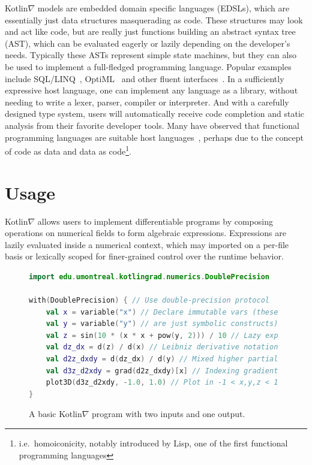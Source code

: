 \documentclass[12pt,initial,twoside,maitrise]{dms}
\numberwithin{equation}{section}
\numberwithin{table}{chapter}
\numberwithin{figure}{chapter}
\begin{document}
Kotlin$\nabla$ models are embedded domain specific languages (EDSLs), which are essentially just data structures masquerading as code. These structures may look and act like code, but are really just functions building an abstract syntax tree (AST), which can be evaluated eagerly or lazily depending on the developer's needs. Typically these ASTs represent simple state machines, but they can also be used to implement a full-fledged programming language. Popular examples include SQL/LINQ~\cite{meijer2006linq}, OptiML~\cite{sujeeth2011optiml} and other fluent interfaces~\cite{fowler05fluent}. In a sufficiently expressive host language, one can implement any language as a library, without needing to write a lexer, parser, compiler or interpreter. And with a carefully designed type system, users will automatically receive code completion and static analysis from their favorite developer tools. Many have observed that functional programming languages are suitable host languages~\cite{elliott2003compiling,rompf2010lightweight}, perhaps due to the concept of code as data and data as code\footnote{i.e.\ homoiconicity, notably introduced by Lisp, one of the first functional programming languages}.

\section{Usage}

Kotlin$\nabla$ allows users to implement differentiable programs by composing operations on numerical fields to form algebraic expressions. Expressions are lazily evaluated inside a numerical context, which may imported on a per-file basis or lexically scoped for finer-grained control over the runtime behavior.

\begin{figure}[!htb]
\begin{lstlisting}[caption={Simple code listing.}, language=Kotlin]
import edu.umontreal.kotlingrad.numerics.DoublePrecision

with(DoublePrecision) { // Use double-precision protocol
    val x = variable("x") // Declare immutable vars (these
    val y = variable("y") // are just symbolic constructs)
    val z = sin(10 * (x * x + pow(y, 2))) / 10 // Lazy exp
    val dz_dx = d(z) / d(x) // Leibniz derivative notation
    val d2z_dxdy = d(dz_dx) / d(y) // Mixed higher partial
    val d3z_d2xdy = grad(d2z_dxdy)[x] // Indexing gradient
    plot3D(d3z_d2xdy, -1.0, 1.0) // Plot in -1 < x,y,z < 1
}
\end{lstlisting}

\caption{A basic Kotlin$\nabla$ program with two inputs and one output.}
\label{label:fig1}
\end{figure}
\end{document}
